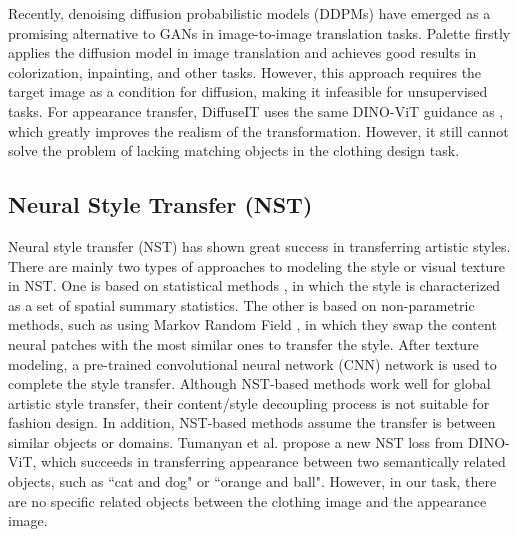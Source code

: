 Recently, denoising diffusion probabilistic models (DDPMs) have emerged as a promising alternative to GANs in image-to-image translation tasks.
Palette \cite{saharia2022palette} firstly applies the diffusion model in image translation and achieves good results in colorization, inpainting, and other tasks.
However, this approach requires the target image as a condition for diffusion, making it infeasible for unsupervised tasks. 
For appearance transfer, DiffuseIT \cite{kwon2022diffusion} uses the same DINO-ViT guidance as \cite{tumanyan2022splicing}, which greatly improves the realism of the transformation. However, it still cannot solve the problem of lacking matching objects in the clothing design task.

 
\subsection{Neural Style Transfer (NST)}

Neural style transfer (NST) has shown great success in transferring artistic styles.
There are mainly two types of approaches to modeling the style or visual texture in NST. One is based on statistical methods \cite{gatys2016image,huang2017arbitrary}, in which the style is characterized as a set of spatial summary statistics. The other is based on non-parametric methods, such as using Markov Random Field \cite{li2016combining,li2016precomputed}, in which they swap the content neural patches with the most similar ones to transfer the style. 
After texture modeling, a pre-trained convolutional neural network (CNN) network is used to complete the style transfer. Although NST-based methods work well for global artistic style transfer, their content/style decoupling process is not suitable for fashion design. 
In addition, NST-based methods assume the transfer is between similar objects or domains.
Tumanyan et al. \cite{tumanyan2022splicing} propose a new NST loss from DINO-ViT, which succeeds in transferring appearance  between two semantically related objects, such as ``cat and dog" or ``orange and ball". However, in our task, there are no specific related objects between the clothing image and the appearance image.
